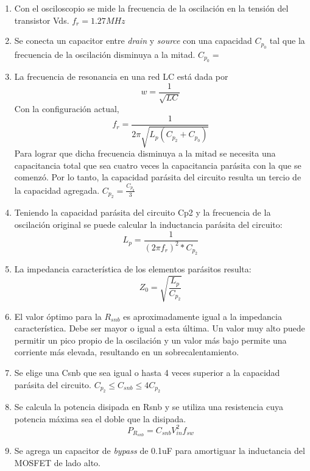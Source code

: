 \begin{enumerate}
    \item Con el osciloscopio se mide la frecuencia de la oscilación en la tensión del transistor Vds. $f_{r}=1.27MHz$ %
    \item Se conecta un capacitor entre \textit{drain} y \textit{source} con una capacidad $C_{p_{0}}$ tal que la frecuencia de la oscilación disminuya a la mitad. $C_{p_{0}}=$
    \item La frecuencia de resonancia en una red LC está dada por
    $$ w=\frac{1}{\sqrt{LC}} $$
    Con la configuración actual, 
    $$ f_{r}=\frac{1}{2\pi\sqrt{L_{p}(C_{p_{2}}+C_{p_{0}})}} $$
    Para lograr que dicha frecuencia disminuya a la mitad se necesita una capacitancia total que sea cuatro veces la capacitancia parásita con la que se comenzó.
    Por lo tanto, la capacidad parásita del circuito resulta un tercio de la capacidad agregada. $C_{p_{2}} = \frac{C_{p_{0}}}{3}$
    \item Teniendo la capacidad parásita del circuito Cp2 y la frecuencia de la oscilación original se puede calcular la inductancia parásita del circuito:
    $$ L_{p}=\frac{1}{(2\pi f_{r})^{2}*C_{p_{2}}} $$
    \item La impedancia característica de los elementos parásitos resulta:
    $$ Z_{0}=\sqrt{\frac{L_p}{C_{p_2}}} $$
    \item El valor óptimo para la $R_{snb}$ es aproximadamente igual a la impedancia característica. Debe ser mayor o igual a esta última. Un valor muy alto puede permitir un pico propio de la oscilación y un valor más bajo permite una corriente más elevada, resultando en un sobrecalentamiento.
    \item Se elige una Csnb que sea igual o hasta 4 veces superior a la capacidad parásita del circuito. $C_{p_2}\leq C_{snb}\leq 4C_{p_2}$
    \item Se calcula la potencia disipada en Rsnb y se utiliza una resistencia cuya potencia máxima sea el doble que la disipada.
    $$ P_{R_{snb}}=C_{snb}V_{in}^2f_{sw} $$
    \item Se agrega un capacitor de \textit{bypass} de 0.1uF para amortiguar la inductancia del MOSFET de lado alto.     
\end{enumerate}
